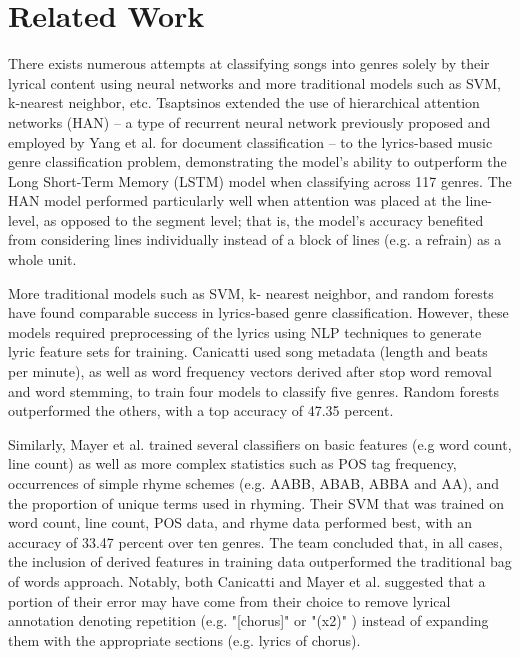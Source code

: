 \documentclass[journal]{IEEEtran}
\begin{document}

\section{Related Work}

There exists numerous attempts at classifying songs into genres solely by their lyrical content using neural networks and more traditional models such as SVM, k-nearest neighbor, etc.
Tsaptsinos \cite{tsaptsinos} extended the use of hierarchical attention networks (HAN) -- a type of recurrent neural network previously proposed and employed by Yang et al. \cite{Yang} for document classification -- to the lyrics-based music genre classification problem, demonstrating the model's ability to outperform the Long Short-Term Memory (LSTM) model when classifying across 117 genres. The HAN model performed particularly well when attention was placed at the line-level, as opposed to the segment level; that is, the model's accuracy benefited from considering lines individually instead of a block of lines (e.g. a refrain) as a whole unit. \par

More traditional models such as SVM, k- nearest neighbor, and random forests have found comparable success in lyrics-based genre classification. However, these models required preprocessing of the lyrics using NLP techniques to generate lyric feature sets for training. Canicatti \cite{canicatti} used song metadata (length and beats per minute), as well as word frequency vectors derived after stop word removal and word stemming, to train four models to classify five genres. Random forests outperformed the others, with a top accuracy of 47.35 percent. \par

Similarly, Mayer et al. \cite{mayer} trained several classifiers on basic features (e.g word count, line count) as well as more complex statistics such as POS tag frequency, occurrences of simple rhyme schemes (e.g. AABB, ABAB, ABBA and AA), and the proportion of unique terms used in rhyming. Their SVM that was trained on word count, line count, POS data, and rhyme data performed best, with an accuracy of 33.47 percent over ten genres. The team concluded that, in all cases, the inclusion of derived features in training data outperformed the traditional bag of words approach. Notably, both Canicatti and Mayer et al. suggested that a portion of their error may have come from their choice to remove lyrical annotation denoting repetition (e.g. "[chorus]" or "(x2)" ) instead of expanding them with the appropriate sections (e.g. lyrics of chorus). \par
\end{document}
